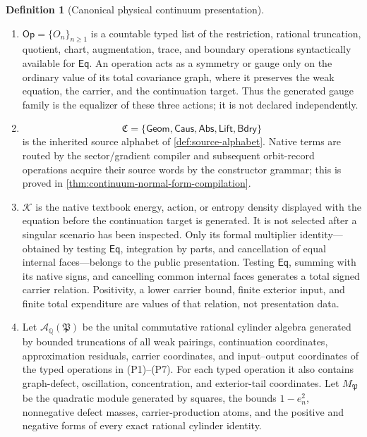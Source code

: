 \documentclass[11pt]{article}
\numberwithin{section}{part}
\theoremstyle{plain}
\theoremstyle{definition}
\newtheorem{definition}[definition]{Definition}
\theoremstyle{remark}
\newcommand{\Geom}{\mathsf{Geom}}
\newcommand{\Caus}{\mathsf{Caus}}
\newcommand{\Abs}{\mathsf{Abs}}
\newcommand{\Lift}{\mathsf{Lift}}
\newcommand{\Bdry}{\mathsf{Bdry}}
\newcommand{\Channels}{\mathfrak C}
\begin{document}
\begin{definition}[Canonical physical continuum presentation]
\begin{enumerate}[label=\textup{(P\arabic*)}]
regularity class: two local paths are related when their restrictions agree.
No continuation theorem is supplied.  Its ordinary values are actual regular
extensions and its graph-boundary values are terminal germs.  The singular
target is generated from this graph by \cref{def:singular-target}; it is not
an independently chosen favorable subset.
\item \(\mathsf{Op}=\{O_n\}_{n\ge1}\) is a countable typed list of the
restriction, rational truncation, quotient, chart, augmentation, trace, and
boundary operations syntactically available for \(\mathsf{Eq}\).  An operation
acts as a symmetry or gauge only on the ordinary value of its total covariance
graph, where it preserves the weak equation, the carrier, and the continuation
target.  Thus the generated gauge family is the equalizer of these three
actions; it is not declared independently.
\item
\[
 \Channels=\{\Geom,\Caus,\Abs,\Lift,\Bdry\}
\]
is the inherited source alphabet of \cref{def:source-alphabet}.  Native terms
are routed by the sector/gradient compiler and subsequent orbit-record
operations acquire their source words by the constructor grammar; this is
proved in \cref{thm:continuum-normal-form-compilation}.
\item \(\mathcal K\) is the native textbook energy, action, or entropy density
displayed with the equation before the continuation target is generated.  It
is not selected after a singular scenario has been inspected.  Only its
formal multiplier identity---obtained
by testing \(\mathsf{Eq}\), integration by parts, and cancellation of equal
internal faces---belongs to the public presentation.  Testing
\(\mathsf{Eq}\), summing with its native signs,
and cancelling common internal faces generates a total signed carrier
relation.  Positivity, a lower carrier bound, finite exterior input, and finite
total expenditure are values of that relation, not presentation data.
\item Let \(\mathcal A_{\mathbb Q}(\mathfrak P)\) be the unital commutative
rational cylinder algebra generated by bounded truncations of all weak
pairings, continuation coordinates, approximation residuals, carrier
coordinates, and input--output coordinates of the typed operations in
\textup{(P1)}--\textup{(P7)}.  For each typed operation it also contains
graph-defect, oscillation, concentration, and exterior-tail coordinates.
Let \(M_{\mathfrak P}\) be the quadratic module generated by squares, the
bounds \(1-e_n^2\), nonnegative defect masses, carrier-production atoms, and
the positive and negative forms of every exact rational cylinder identity.

\end{enumerate}
\end{definition}
\end{document}
